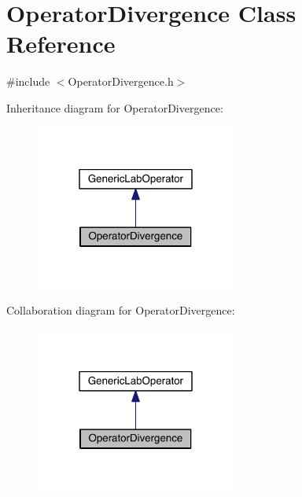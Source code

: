\hypertarget{class_operator_divergence}{}\section{Operator\+Divergence Class Reference}
\label{class_operator_divergence}


{\ttfamily \#include $<$Operator\+Divergence.\+h$>$}



Inheritance diagram for Operator\+Divergence\+:\nopagebreak
\begin{figure}[H]
\begin{center}
\leavevmode
\includegraphics[width=187pt]{d4/d25/class_operator_divergence__inherit__graph}
\end{center}
\end{figure}


Collaboration diagram for Operator\+Divergence\+:\nopagebreak
\begin{figure}[H]
\begin{center}
\leavevmode
\includegraphics[width=187pt]{d1/d49/class_operator_divergence__coll__graph}
\end{center}
\end{figure}
